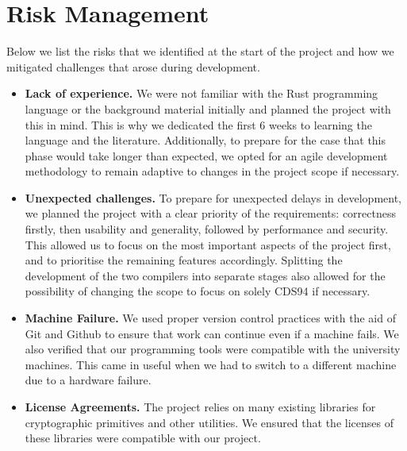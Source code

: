 \section{Risk Management}
Below we list the risks that we identified at the start of the project and how we mitigated
challenges that arose during development.
\begin{itemize}
  \item \textbf{Lack of experience.} We were not familiar with the Rust programming
  language or the background material initially and planned the project with this in mind. This 
  is why we dedicated the first 6 weeks to learning the language and the literature. Additionally,
  to prepare for the case that this phase would take longer than expected, we opted for an agile 
  development methodology to remain adaptive to changes in the project scope if necessary.
  \item \textbf{Unexpected challenges.} To prepare for unexpected delays in development, we 
  planned the project with a clear priority of the requirements: correctness firstly, then 
  usability and generality, followed by performance and security. This allowed us to focus on
  the most important aspects of the project first, and to prioritise the remaining features
  accordingly. Splitting the development of the two compilers into separate stages also allowed 
  for the possibility of changing the scope to focus on solely CDS94 if necessary. 
  \item \textbf{Machine Failure.} We used proper version control practices with the aid of 
  Git and Github to ensure that work can continue even if a machine fails. We also verified 
  that our programming tools were compatible with the university machines. This came in useful 
  when we had to switch to a different machine due to a hardware failure.
  \item \textbf{License Agreements.} The project relies on many existing libraries for 
  cryptographic primitives and other utilities. We ensured that the licenses of these libraries
  were compatible with our project. 
\end{itemize}
